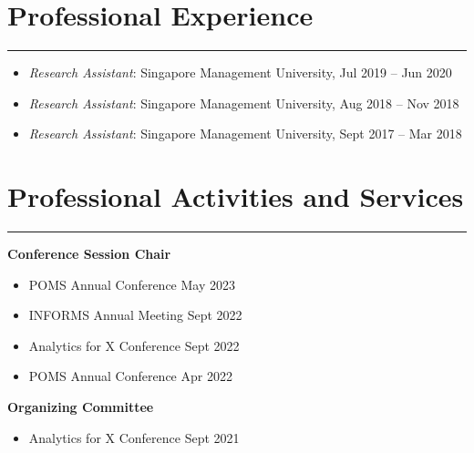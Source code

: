 \documentclass[12pt, a4paper]{article}
\begin{document}
{\section*{Professional Experience}
\vspace*{0.4em}
\hrule height 0.5pt



\begin{itemize}[leftmargin=26pt, itemsep=0pt, parsep=0.2pt, topsep=1pt]
	\item {\it Research Assistant}: Singapore Management University, Jul 2019 -- Jun 2020
	\item {\it Research Assistant}: Singapore Management University, Aug 2018 -- Nov 2018
  \item {\it Research Assistant}: Singapore Management University, Sept 2017 -- Mar 2018
\end{itemize}




\section*{Professional Activities and Services}
\vspace*{0.4em}
\hrule height 0.5pt



\raggedright\textbf{Conference Session Chair}

\begin{itemize}[leftmargin=26pt, itemsep=2pt, parsep=0pt, topsep=-0.5em]
	\item POMS Annual Conference \hfill May 2023
	\item INFORMS Annual Meeting \hfill Sept 2022
	\item Analytics for X Conference \hfill Sept 2022
	\item POMS Annual Conference \hfill Apr 2022
\end{itemize}



\raggedright\textbf{Organizing Committee}

\begin{itemize}[leftmargin=26pt, itemsep=2pt, parsep=0pt, topsep=-0.5em]
	\item Analytics for X Conference \hfill Sept 2021
\end{itemize}



}
\end{document}
